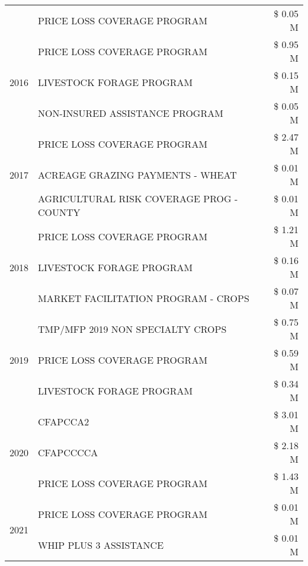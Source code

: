 \begin{tabular}{llr}
 & PRICE LOSS COVERAGE PROGRAM & \$ 0.05 M \\
\cline{1-3}
\multirow[t]{3}{*}{2016} & PRICE LOSS COVERAGE PROGRAM & \$ 0.95 M \\
 & LIVESTOCK FORAGE PROGRAM & \$ 0.15 M \\
 & NON-INSURED ASSISTANCE PROGRAM & \$ 0.05 M \\
\cline{1-3}
\multirow[t]{3}{*}{2017} & PRICE LOSS COVERAGE PROGRAM & \$ 2.47 M \\
 & ACREAGE GRAZING PAYMENTS - WHEAT & \$ 0.01 M \\
 & AGRICULTURAL RISK COVERAGE PROG - COUNTY & \$ 0.01 M \\
\cline{1-3}
\multirow[t]{3}{*}{2018} & PRICE LOSS COVERAGE PROGRAM & \$ 1.21 M \\
 & LIVESTOCK FORAGE PROGRAM & \$ 0.16 M \\
 & MARKET FACILITATION PROGRAM - CROPS & \$ 0.07 M \\
\cline{1-3}
\multirow[t]{3}{*}{2019} & TMP/MFP 2019 NON SPECIALTY CROPS & \$ 0.75 M \\
 & PRICE LOSS COVERAGE PROGRAM & \$ 0.59 M \\
 & LIVESTOCK FORAGE PROGRAM & \$ 0.34 M \\
\cline{1-3}
\multirow[t]{3}{*}{2020} & CFAPCCA2 & \$ 3.01 M \\
 & CFAPCCCCA & \$ 2.18 M \\
 & PRICE LOSS COVERAGE PROGRAM & \$ 1.43 M \\
\cline{1-3}
\multirow[t]{2}{*}{2021} & PRICE LOSS COVERAGE PROGRAM & \$ 0.01 M \\
 & WHIP PLUS 3 ASSISTANCE & \$ 0.01 M \\
\cline{1-3}
\bottomrule
\end{tabular}
